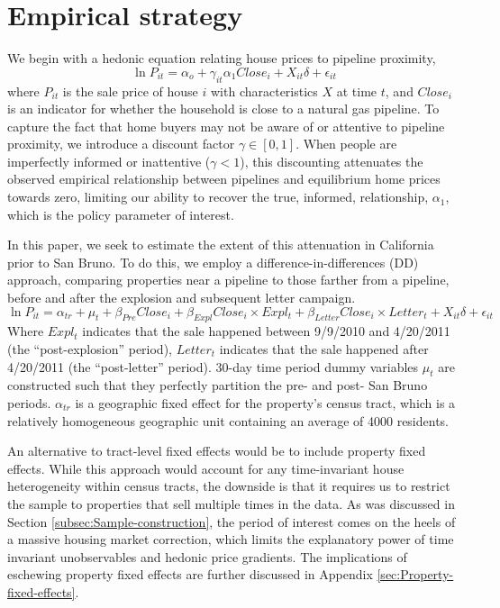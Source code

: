 \documentclass[12pt]{article}
\begin{document}
\section{Empirical strategy \label{sec:Empirical-strategy}}

We begin with a hedonic equation relating house prices to pipeline
proximity, 
\begin{equation}
\ln P_{it}=\alpha_{o}+\gamma_{it}\alpha_{1}Close_{i}+X_{it}\delta+\epsilon_{it}\label{eq:structural}
\end{equation}
where $P_{it}$ is the sale price of house $i$ with characteristics
$X$ at time $t$, and $Close_{i}$ is an indicator for whether the
household is close to a natural gas pipeline. To capture the fact
that home buyers may not be aware of or attentive to pipeline proximity,
we introduce a discount factor $\gamma\in[0,1]$. When people are
imperfectly informed or inattentive ($\gamma<1$), this discounting
attenuates the observed empirical relationship between pipelines and
equilibrium home prices towards zero, limiting our ability to recover
the true, informed, relationship, $\alpha_{1}$, which is the policy
parameter of interest. 

In this paper, we seek to estimate the extent of this attenuation
in California prior to San Bruno. To do this, we employ a difference-in-differences
(DD) approach, comparing properties near a pipeline to those farther
from a pipeline, before and after the explosion and subsequent letter
campaign. 
\begin{equation}
\ln P_{it}=\alpha_{tr}+\mu_{t}+\beta_{Pre}Close_{i}+\beta_{Expl}Close_{i}\times Expl_{t}+\beta_{Letter}Close_{i}\times Letter_{t}+X_{it}\delta+\epsilon_{it}\label{eq:main_DD}
\end{equation}
Where $Expl_{t}$ indicates that the sale happened between 9/9/2010
and 4/20/2011 (the ``post-explosion'' period), $Letter_{t}$ indicates
that the sale happened after 4/20/2011 (the ``post-letter'' period).
30-day time period dummy variables $\mu_{t}$ are constructed such
that they perfectly partition the pre- and post- San Bruno periods.
$\alpha_{tr}$ is a geographic fixed effect for the property's census
tract, which is a relatively homogeneous geographic unit containing
an average of 4000 residents.

An alternative to tract-level fixed effects would be to include property
fixed effects. While this approach would account for any time-invariant house
heterogeneity within census tracts, the downside is that it requires us to restrict the sample to properties that sell
multiple times in the data. As was discussed in Section \ref{subsec:Sample-construction},
the period of interest comes on the heels of a massive housing market
correction, which limits the explanatory power of time invariant unobservables
and hedonic price gradients. The implications of eschewing property
fixed effects are further discussed in Appendix \ref{sec:Property-fixed-effects}. 
\end{document}

